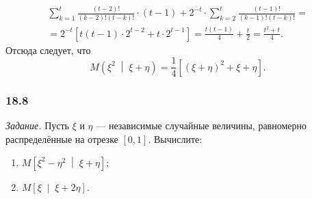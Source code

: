 \begin{enumerate}[label=\alph*)]
\begin{equation*}
\begin{split}
      \sum \limits_{k = 1}^t
        \frac{ \left( t - 2 \right)!}{ \left( k - 2 \right)! \left( t - k \right)!} \cdot
      \left( t - 1 \right) +
      2^{-t} \cdot
      \sum \limits_{k = 2}^t
        \frac{ \left( t - 1 \right)!}{ \left( k - 1 \right)! \left( t - k \right)!} = \\
      = 2^{-t} \left[ t \left( t - 1 \right) \cdot 2^{t - 2} + t \cdot 2^{t - 1} \right] =
      \frac{t \left( t - 1 \right) }{4} + \frac{t}{2} =
      \frac{t^2 + t}{4}.
    \end{split}
  \end{equation*}
  Отсюда следует, что
  $$M \left( \xi^2 \; \middle| \; \xi + \eta \right) =
    \frac{1}{4} \left[ \left( \xi + \eta \right)^2 + \xi + \eta \right].$$
\end{enumerate}

\subsubsection*{18.8}

\textit{Задание.}
Пусть $ \xi $ и $ \eta $ --- независимые случайные величины,
равномерно распределённые на отрезке $ \left[ 0, 1 \right] $.
Вычислите:
\begin{enumerate}[label=\alph*)]
  \item $M \left[ \xi^2 - \eta^2 \; \middle| \; \xi + \eta \right] $;
  \item $M \left[ \xi \; \middle| \; \xi + 2 \eta \right] $.
\end{enumerate}

